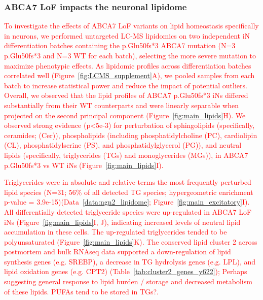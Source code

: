\subsubsection{ABCA7 LoF impacts the neuronal lipidome}
\textcolor{red}{To investigate the effects of ABCA7 LoF variants on lipid homeostasis specifically in neurons, we performed untargeted LC-MS lipidomics on two independent iN differentiation batches containing the p.Glu50fs*3 ABCA7 mutation (N=3 p.Glu50fs*3 and N=3 WT for each batch), selecting the more severe mutation to maximize phenotypic effects. As lipidomic profiles across differentiation batches correlated well (Figure~\ref{fig:LCMS_supplement}A), we pooled samples from each batch to increase statistical power and reduce the impact of potential outliers. Overall, we observed that the lipid profiles of ABCA7 p.Glu50fs*3 iNs differed substantially from their WT counterparts and were linearly separable when projected on the second principal component (Figure~\ref{fig:main_lipids}H). We observed strong evidence (p<5e-3) for perturbation of sphingolipids (specifically, ceramides; (Cer)), phospholipids (including phosphatidylcholine (PC), cardiolipin (CL), phosphatidylserine (PS), and phosphatidylglycerol (PG)), and neutral lipids (specifically, triglycerides (TGs) and monoglycerides (MGs)), in ABCA7 p.Glu50fs*3 vs WT iNs (Figure~\ref{fig:main_lipids}I).} 

\textcolor{red}{Triglycerides were in absolute and relative terms the most frequently perturbed lipid species (N=31; 56\% of all detected TG species; hypergeometric enrichment p-value = 3.9e-15)(Data~\ref{data:ngn2_lipidome}; Figure~\ref{fig:main_excitatory}I). All differentially detected triglyceride species were up-regulated in ABCA7 LoF iNs (Figure~\ref{fig:main_lipids}I, J), indicating increased levels of neutral lipid accumulation in these cells. The up-regulated triglycerides tended to be polyunsaturated (Figure~\ref{fig:main_lipids}K). The conserved lipid cluster 2 across postmortem and bulk RNAseq data supported a down-regulation of lipid synthesis genes (e.g. SREBP), a decrease in TG hydrolysis genes (e.g. LPL), and lipid oxidation genes (e.g. CPT2) (Table~\ref{tab:cluster2_genes_y622}); Perhaps suggesting general response to lipid burden / storage and decreased metabolism of these lipids. PUFAs tend to be stored in TGs?.}

